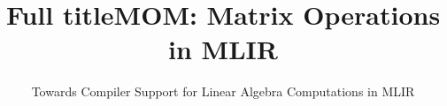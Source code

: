 \documentclass[conference]{IEEEtran}
\begin{document}
\ifx\paperversion\paperversioncameraIEEE
  \title{Full title}
\else
  \title[]{MOM: Matrix Operations in MLIR}       %
  \subtitle{Towards Compiler Support for Linear Algebra Computations in MLIR} %
\fi


\end{document}
